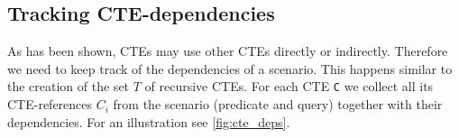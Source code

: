 

\subsection{Tracking CTE-dependencies}\label{tracking_cte_dependencies}
As has been shown, CTEs may use other CTEs directly or indirectly. Therefore we need to keep track of the dependencies of a scenario. This happens similar to the creation of the set $T$ of recursive CTEs. For each CTE \texttt{C} we collect all its CTE-references \texttt{$C_i$} from the scenario (predicate and query) together with their dependencies. For an illustration see \autoref{fig:cte_deps}.

